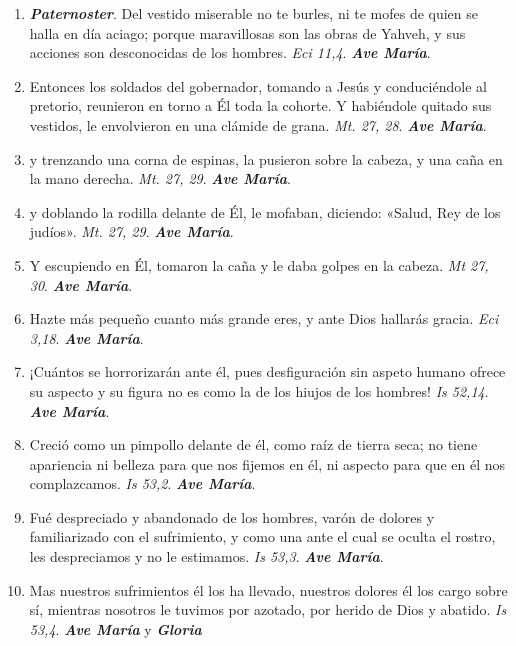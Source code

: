 \documentclass[../../devocionario.tex]{subfiles}
\begin{document}
    \begin{enumerate}
    
        \item \textbf{\textit{Paternoster}}. Del vestido miserable no te burles, ni te mofes de quien se halla en día aciago; 
            porque maravillosas son las obras de Yahveh, y sus acciones son desconocidas de los hombres. \textit{Eci 11,4}. \textbf{\textit{Ave María}}.

        \item Entonces los soldados del gobernador, tomando a Jesús y conduciéndole al pretorio, reunieron en torno a Él toda la cohorte. 
            Y habiéndole quitado sus vestidos, le envolvieron en una clámide de grana. \textit{Mt. 27, 28}. \textbf{\textit{Ave María}}.

        \item y trenzando una corna de espinas, la pusieron sobre la cabeza, y una caña en la mano derecha. \textit{Mt. 27, 29}. \textbf{\textit{Ave María}}.

        \item y doblando la rodilla delante de Él, le mofaban, diciendo: «Salud, Rey de los judíos». \textit{Mt. 27, 29}. \textbf{\textit{Ave María}}.

        \item Y escupiendo en Él, tomaron la caña y le daba golpes en la cabeza. \textit{Mt 27, 30}. \textbf{\textit{Ave María}}.

        \item Hazte más pequeño cuanto más grande eres, y ante Dios hallarás gracia. \textit{Eci 3,18}. \textbf{\textit{Ave María}}.

        \item ¡Cuántos se horrorizarán ante él, pues desfiguración sin aspeto humano ofrece su aspecto y su figura 
            no es como la de los hiujos de los hombres! \textit{Is 52,14}. \textbf{\textit{Ave María}}.

        \item Creció como un pimpollo delante de él, como raíz de tierra seca; no tiene apariencia ni belleza para 
            que nos fijemos en él, ni aspecto para que en él nos complazcamos. \textit{Is 53,2}. \textbf{\textit{Ave María}}.

        \item Fué despreciado y abandonado de los hombres, varón de dolores y familiarizado con el sufrimiento, 
            y como una ante el cual se oculta el rostro, les despreciamos y no le estimamos. \textit{Is 53,3}. \textbf{\textit{Ave María}}.

        \item Mas nuestros sufrimientos él los ha llevado, nuestros dolores él los cargo sobre sí, 
            mientras nosotros le tuvimos por azotado, por herido de Dios y abatido. \textit{Is 53,4}. \textbf{\textit{Ave María}} y \textbf{\textit{Gloria}}

    \end{enumerate}
\end{document}
